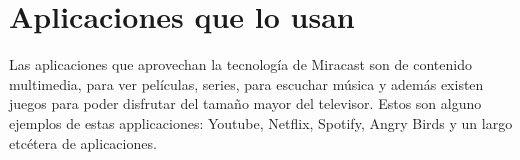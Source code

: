 \section{Aplicaciones que lo usan}

Las aplicaciones que aprovechan la tecnología de Miracast son de contenido multimedia, para ver películas, series, para escuchar música y además existen juegos para poder disfrutar del tamaño mayor del televisor. Estos son alguno ejemplos de estas applicaciones: Youtube, Netflix, Spotify, Angry Birds y un largo etcétera de aplicaciones.

